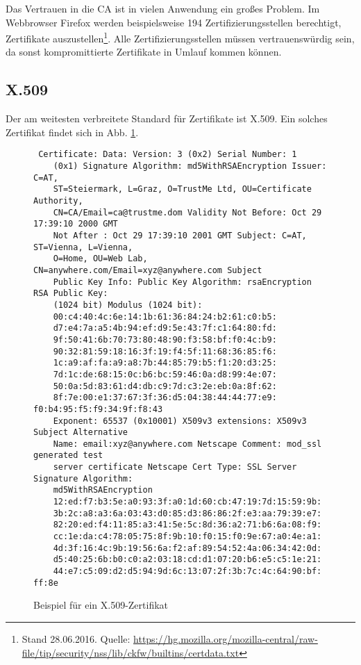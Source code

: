Das Vertrauen in die CA ist in vielen Anwendung ein großes Problem. Im
Webbrowser Firefox werden beispielsweise 194 Zertifizierungsstellen
berechtigt, Zertifikate auszustellen\footnote{Stand 28.06.2016. Quelle:
  \url{https://hg.mozilla.org/mozilla-central/raw-file/tip/security/nss/lib/ckfw/builtins/certdata.txt}}. Alle
Zertifizierungsstellen müssen vertrauenswürdig sein, da sonst
kompromittierte Zertifikate in Umlauf kommen können.

\subsection{X.509}\indexXFiveZeroNine Der am weitesten verbreitete
Standard für Zertifikate ist X.509. Ein solches Zertifikat findet sich
in Abb. \ref{fig:x509}.
\begin{figure}
  \begin{lstlisting} Certificate: Data: Version: 3 (0x2) Serial Number: 1
    (0x1) Signature Algorithm: md5WithRSAEncryption Issuer: C=AT,
    ST=Steiermark, L=Graz, O=TrustMe Ltd, OU=Certificate Authority,
    CN=CA/Email=ca@trustme.dom Validity Not Before: Oct 29 17:39:10 2000 GMT
    Not After : Oct 29 17:39:10 2001 GMT Subject: C=AT, ST=Vienna, L=Vienna,
    O=Home, OU=Web Lab, CN=anywhere.com/Email=xyz@anywhere.com Subject
    Public Key Info: Public Key Algorithm: rsaEncryption RSA Public Key:
    (1024 bit) Modulus (1024 bit):
    00:c4:40:4c:6e:14:1b:61:36:84:24:b2:61:c0:b5:
    d7:e4:7a:a5:4b:94:ef:d9:5e:43:7f:c1:64:80:fd:
    9f:50:41:6b:70:73:80:48:90:f3:58:bf:f0:4c:b9:
    90:32:81:59:18:16:3f:19:f4:5f:11:68:36:85:f6:
    1c:a9:af:fa:a9:a8:7b:44:85:79:b5:f1:20:d3:25:
    7d:1c:de:68:15:0c:b6:bc:59:46:0a:d8:99:4e:07:
    50:0a:5d:83:61:d4:db:c9:7d:c3:2e:eb:0a:8f:62:
    8f:7e:00:e1:37:67:3f:36:d5:04:38:44:44:77:e9: f0:b4:95:f5:f9:34:9f:f8:43
    Exponent: 65537 (0x10001) X509v3 extensions: X509v3 Subject Alternative
    Name: email:xyz@anywhere.com Netscape Comment: mod_ssl generated test
    server certificate Netscape Cert Type: SSL Server Signature Algorithm:
    md5WithRSAEncryption
    12:ed:f7:b3:5e:a0:93:3f:a0:1d:60:cb:47:19:7d:15:59:9b:
    3b:2c:a8:a3:6a:03:43:d0:85:d3:86:86:2f:e3:aa:79:39:e7:
    82:20:ed:f4:11:85:a3:41:5e:5c:8d:36:a2:71:b6:6a:08:f9:
    cc:1e:da:c4:78:05:75:8f:9b:10:f0:15:f0:9e:67:a0:4e:a1:
    4d:3f:16:4c:9b:19:56:6a:f2:af:89:54:52:4a:06:34:42:0d:
    d5:40:25:6b:b0:c0:a2:03:18:cd:d1:07:20:b6:e5:c5:1e:21:
    44:e7:c5:09:d2:d5:94:9d:6c:13:07:2f:3b:7c:4c:64:90:bf: ff:8e
  \end{lstlisting}
  \caption{Beispiel für ein X.509-Zertifikat}
  \label{fig:x509}
\end{figure}

